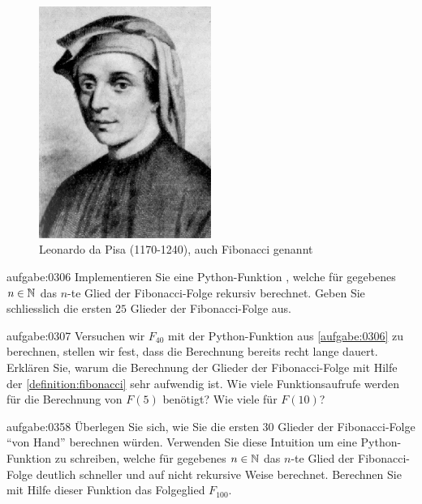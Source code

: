\begin{figure}[H]
    \centering
    \includegraphics[width=0.5\textwidth]{Fibonacci.jpg}
    \caption{Leonardo da Pisa (1170-1240), auch Fibonacci genannt}
    \label{fig:Fibonacci}
\end{figure}

\clearpage

\begin{aufgabe}{aufgabe:0306}
Implementieren Sie eine Python-Funktion , welche für gegebenes $n\in\mathbb{N}$ das $n$-te Glied der Fibonacci-Folge rekursiv berechnet. Geben Sie schliesslich die ersten $25$ Glieder der Fibonacci-Folge aus.
\end{aufgabe}

\begin{aufgabe}{aufgabe:0307}
Versuchen wir $F_{40}$ mit der Python-Funktion aus \cref{aufgabe:0306} zu berechnen, stellen wir fest, dass die Berechnung bereits recht lange dauert. Erklären Sie, warum die Berechnung der Glieder der Fibonacci-Folge mit Hilfe der \cref{definition:fibonacci} sehr aufwendig ist. Wie viele Funktionsaufrufe werden für die Berechnung von $F(5)$ benötigt? Wie viele für $F(10)$?
\end{aufgabe}

\begin{aufgabe}{aufgabe:0358}
Überlegen Sie sich, wie Sie die ersten $30$ Glieder der Fibonacci-Folge \enquote{von Hand} berechnen würden. Verwenden Sie diese Intuition um eine Python-Funktion  zu schreiben, welche für gegebenes $n\in\mathbb{N}$ das $n$-te Glied der Fibonacci-Folge deutlich schneller und auf nicht rekursive Weise berechnet. Berechnen Sie mit Hilfe dieser Funktion das Folgeglied $F_{100}$.
\end{aufgabe}

